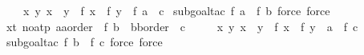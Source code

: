 \begin{isabellebody}
\ \ \ \ {\isacharparenleft}{\kern0pt}{\isacharbang}{\kern0pt}{\isacharbang}{\kern0pt}x\ y{\isachardot}{\kern0pt}\ x\ {\isachargreater}{\kern0pt}{\isacharequal}{\kern0pt}\ y\ {\isacharequal}{\kern0pt}{\isacharequal}{\kern0pt}{\isachargreater}{\kern0pt}\ f\ x\ {\isachargreater}{\kern0pt}{\isacharequal}{\kern0pt}\ f\ y{\isacharparenright}{\kern0pt}\ {\isacharequal}{\kern0pt}{\isacharequal}{\kern0pt}{\isachargreater}{\kern0pt}\ f\ a\ {\isachargreater}{\kern0pt}\ c{\isachardoublequoteclose}\isanewline
%
\isadelimproof
%
\endisadelimproof
%
\isatagproof
{}\isamarkupfalse%
\ {\isacharparenleft}{\kern0pt}subgoal{\isacharunderscore}{\kern0pt}tac\ {\isachardoublequoteopen}f\ a\ {\isachargreater}{\kern0pt}{\isacharequal}{\kern0pt}\ f\ b{\isachardoublequoteclose}{\isacharcomma}{\kern0pt}\ force{\isacharcomma}{\kern0pt}\ force{\isacharparenright}{\kern0pt}%
\endisatagproof
{\isafoldproof}%
%
\isadelimproof
\isanewline
%
\endisadelimproof
\isanewline
{}\isamarkupfalse%
\ xt{}\ {\isacharbrackleft}{\kern0pt}no{\isacharunderscore}{\kern0pt}atp{\isacharbrackright}{\kern0pt}{\isacharcolon}{\kern0pt}\ {\isachardoublequoteopen}{\isacharparenleft}{\kern0pt}a{\isacharcolon}{\kern0pt}{\isacharcolon}{\kern0pt}{\isacharprime}{\kern0pt}a{\isacharcolon}{\kern0pt}{\isacharcolon}{\kern0pt}order{\isacharparenright}{\kern0pt}\ {\isachargreater}{\kern0pt}\ f\ b\ {\isacharequal}{\kern0pt}{\isacharequal}{\kern0pt}{\isachargreater}{\kern0pt}\ {\isacharparenleft}{\kern0pt}b{\isacharcolon}{\kern0pt}{\isacharcolon}{\kern0pt}{\isacharprime}{\kern0pt}b{\isacharcolon}{\kern0pt}{\isacharcolon}{\kern0pt}order{\isacharparenright}{\kern0pt}\ {\isachargreater}{\kern0pt}\ c\ {\isacharequal}{\kern0pt}{\isacharequal}{\kern0pt}{\isachargreater}{\kern0pt}\isanewline
\ \ \ \ {\isacharparenleft}{\kern0pt}{\isacharbang}{\kern0pt}{\isacharbang}{\kern0pt}x\ y{\isachardot}{\kern0pt}\ x\ {\isachargreater}{\kern0pt}\ y\ {\isacharequal}{\kern0pt}{\isacharequal}{\kern0pt}{\isachargreater}{\kern0pt}\ f\ x\ {\isachargreater}{\kern0pt}\ f\ y{\isacharparenright}{\kern0pt}\ {\isacharequal}{\kern0pt}{\isacharequal}{\kern0pt}{\isachargreater}{\kern0pt}\ a\ {\isachargreater}{\kern0pt}\ f\ c{\isachardoublequoteclose}\isanewline
%
\isadelimproof
%
\endisadelimproof
%
\isatagproof
{}\isamarkupfalse%
\ {\isacharparenleft}{\kern0pt}subgoal{\isacharunderscore}{\kern0pt}tac\ {\isachardoublequoteopen}f\ b\ {\isachargreater}{\kern0pt}\ f\ c{\isachardoublequoteclose}{\isacharcomma}{\kern0pt}\ force{\isacharcomma}{\kern0pt}\ force{\isacharparenright}{\kern0pt}%
\endisatagproof
{\isafoldproof}%

\end{isabellebody}

